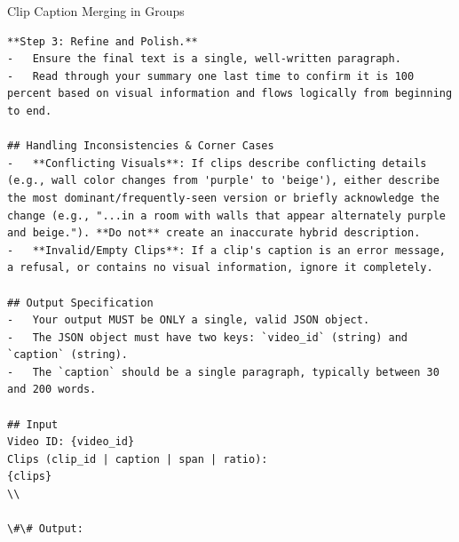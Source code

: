 \begin{promptbox}{Clip Caption Merging in Groups}
\begin{lstlisting}[style=promptstyle]
**Step 3: Refine and Polish.**
-   Ensure the final text is a single, well-written paragraph.
-   Read through your summary one last time to confirm it is 100 percent based on visual information and flows logically from beginning to end.

## Handling Inconsistencies & Corner Cases
-   **Conflicting Visuals**: If clips describe conflicting details (e.g., wall color changes from 'purple' to 'beige'), either describe the most dominant/frequently-seen version or briefly acknowledge the change (e.g., "...in a room with walls that appear alternately purple and beige."). **Do not** create an inaccurate hybrid description.
-   **Invalid/Empty Clips**: If a clip's caption is an error message, a refusal, or contains no visual information, ignore it completely.

## Output Specification
-   Your output MUST be ONLY a single, valid JSON object.
-   The JSON object must have two keys: `video_id` (string) and `caption` (string).
-   The `caption` should be a single paragraph, typically between 30 and 200 words.

## Input
Video ID: {video_id}
Clips (clip_id | caption | span | ratio):
{clips}
\\

\#\# Output:
\end{lstlisting}
\end{promptbox}
\fi
